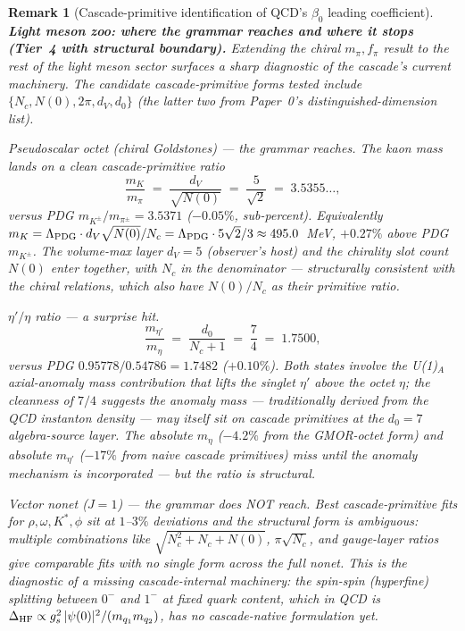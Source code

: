 \documentclass[12pt,a4paper]{article}
\newtheorem*{remark}{Remark}
\begin{document}
\begin{remark}[Cascade-primitive identification of QCD's $\beta_0$ leading coefficient]
\medskip\noindent\textbf{Light meson zoo: where the grammar reaches
and where it stops (Tier~4 with structural boundary).} Extending the
chiral $m_\pi, f_\pi$ result to the rest of the light meson sector
surfaces a sharp diagnostic of the cascade's current machinery. The
candidate cascade-primitive forms tested include
$\{N_c, N(0), 2\pi, d_V, d_0\}$ (the latter two from Paper~0's
distinguished-dimension list).

\emph{Pseudoscalar octet (chiral Goldstones)} --- the grammar reaches.
The kaon mass lands on a clean cascade-primitive ratio
\[
\frac{m_K}{m_\pi} \;=\; \frac{d_V}{\sqrt{N(0)}} \;=\; \frac{5}{\sqrt{2}}
\;=\; 3.5355\ldots,
\]
versus PDG $m_{K^\pm}/m_{\pi^\pm} = 3.5371$ ($-0.05\%$, sub-percent).
Equivalently $m_K = \Lambda_{\rm PDG}\cdot d_V\sqrt{N(0)}/N_c =
\Lambda_{\rm PDG}\cdot 5\sqrt{2}/3 \approx 495.0$~MeV, $+0.27\%$ above
PDG $m_{K^\pm}$. The volume-max layer $d_V=5$ (observer's host) and
the chirality slot count $N(0)$ enter together, with $N_c$ in the
denominator --- structurally consistent with the chiral relations,
which also have $N(0)/N_c$ as their primitive ratio.

\emph{$\eta'/\eta$ ratio} --- a surprise hit.
\[
\frac{m_{\eta'}}{m_\eta} \;=\; \frac{d_0}{N_c+1} \;=\; \frac{7}{4}
\;=\; 1.7500,
\]
versus PDG $0.95778/0.54786 = 1.7482$ ($+0.10\%$). Both states
involve the U(1)$_{\!A}$ axial-anomaly mass contribution that lifts
the singlet $\eta'$ above the octet $\eta$; the cleanness of $7/4$
suggests the anomaly mass --- traditionally derived from the
QCD instanton density --- may itself sit on cascade primitives at
the $d_0=7$ algebra-source layer. The absolute $m_\eta$ ($-4.2\%$
from the GMOR-octet form) and absolute $m_{\eta'}$ ($-17\%$ from
naive cascade primitives) miss until the anomaly mechanism is
incorporated --- but the \emph{ratio} is structural.

\emph{Vector nonet ($J=1$)} --- the grammar does NOT reach.
Best cascade-primitive fits for $\rho, \omega, K^*, \phi$ sit at
$1$--$3\%$ deviations and the structural form is ambiguous: multiple
combinations like $\sqrt{N_c^2+N_c+N(0)}$, $\pi\sqrt{N_c}$, and
gauge-layer ratios give comparable fits with no single form across
the full nonet. This is the diagnostic of a missing cascade-internal
machinery: the spin-spin (hyperfine) splitting between
$0^-$ and $1^-$ at fixed quark content, which in QCD is
$\Delta_{\rm HF} \propto g_s^2\,|\psi(0)|^2 / (m_{q_1}m_{q_2})$,
has no cascade-native formulation yet.


\end{remark}
\end{document}
